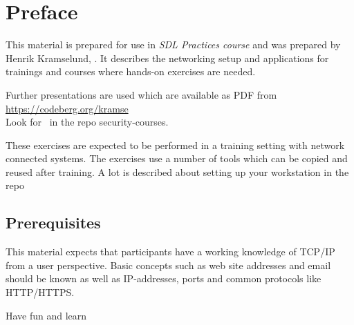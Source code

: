 \documentclass[a4paper,11pt,notitlepage]{report}
\begin{document}
\rm
{}

\newcommand{\subject}[1]{Software Security course}
\newcommand{\kursus}[1]{Software Security course}
\newcommand{\kursusnavn}[1]{Software Security course\\ exercises}



\setcounter{tocdepth}{0}

\normal

{\color{titlecolor}\tableofcontents}

\normal
\pagestyle{fancyplain}
\chapter*{\color{titlecolor}Preface}

This material is prepared for use in \emph{SDL Practices course} and was prepared by
Henrik Kramselund, .
It describes the networking setup and
applications for trainings and courses where hands-on exercises are needed.

Further presentations are used which are available as PDF from \url{https://codeberg.org/kramse}\\
Look for \jobname\ in the repo security-courses.

These exercises are expected to be performed in a training setting with network connected systems. The exercises use a number of tools which can be copied and reused after training. A lot is described about setting up your workstation in the repo



\section*{\color{titlecolor}Prerequisites}

This material expects that participants have a working knowledge of
TCP/IP from a user perspective. Basic concepts such as web site addresses and email should be known as well as IP-addresses, ports and common protocols like HTTP/HTTPS.

\vskip 1cm
Have fun and learn
\eject

\rhead{\fancyplain{}{\bf \chaptername\ \thechapter}}
\end{document}
